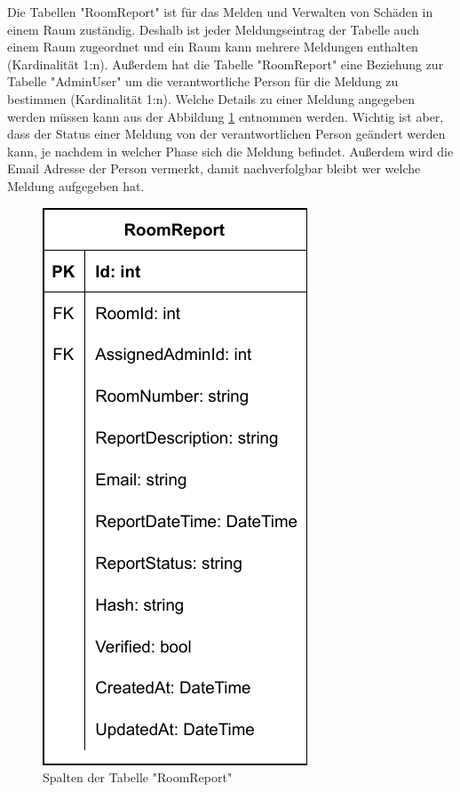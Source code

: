 
Die Tabellen "RoomReport" ist für das Melden und Verwalten von Schäden in einem Raum zuständig. Deshalb ist jeder Meldungseintrag der Tabelle auch einem Raum zugeordnet und ein Raum kann mehrere Meldungen enthalten (Kardinalität 1:n). Außerdem hat die Tabelle "RoomReport" eine Beziehung zur Tabelle "AdminUser" um die verantwortliche Person für die Meldung zu bestimmen (Kardinalität 1:n). Welche Details zu einer Meldung angegeben werden müssen kann aus der Abbildung \ref{fig:RoomReportColls} entnommen werden. Wichtig ist aber, dass der Status einer Meldung von der verantwortlichen Person geändert werden kann, je nachdem in welcher Phase sich die Meldung befindet. Außerdem wird die Email Adresse der Person vermerkt, damit nachverfolgbar bleibt wer welche Meldung aufgegeben hat.

\begin{figure}[H]
    \centering
    \includegraphics{media/MariaDB/RoomReport.svg.pdf}
    \caption{Spalten der Tabelle "RoomReport"}
    \label{fig:RoomReportColls}
\end{figure}

